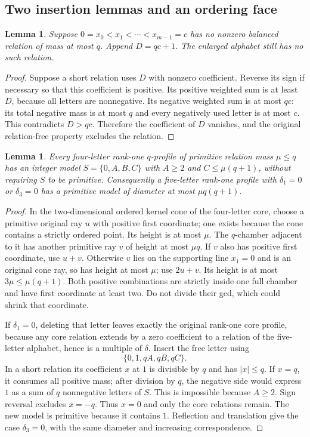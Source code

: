 \documentclass[11pt,reqno]{amsart}
\theoremstyle{plain}
\newtheorem{lemma}[theorem]{Lemma}
\theoremstyle{definition}
\theoremstyle{plain}
\theoremstyle{plain}
\theoremstyle{plain}
\theoremstyle{plain}
\theoremstyle{plain}
\theoremstyle{plain}
\theoremstyle{definition}
\theoremstyle{definition}
\theoremstyle{definition}
\theoremstyle{plain}
\begin{document}
\subsection{Two insertion lemmas and an ordering face}
\begin{lemma}\label{M-lem:append-qc-plus-one}
Suppose $0=x_0<x_1<\cdots<x_{m-1}=c$ has no nonzero balanced relation of mass
at most $q$. Append $D=qc+1$. The enlarged alphabet still has no such
relation.
\end{lemma}
\begin{proof}
Suppose a short relation uses $D$ with nonzero coefficient. Reverse its sign
if necessary so that this coefficient is positive. Its positive weighted sum
is at least $D$, because all letters are nonnegative. Its negative weighted
sum is at most $qc$: its total negative mass is at most $q$ and every
negatively used letter is at most $c$. This contradicts $D>qc$. Therefore the
coefficient of $D$ vanishes, and the original relation-free property excludes
the relation.
\end{proof}

\begin{lemma}\label{M-lem:model-near-end}
Every four-letter rank-one $q$-profile of primitive relation mass
$\mu\le q$ has an integer model $S=\{0,A,B,C\}$ with $A\ge2$ and
$C\le\mu(q+1)$, without requiring $S$ to be primitive. Consequently a
five-letter rank-one profile with $\delta_1=0$ or $\delta_3=0$ has a
primitive model of diameter at most $\mu q(q+1)$.
\end{lemma}
\begin{proof}
In the two-dimensional ordered kernel cone of the four-letter core,
choose a primitive original ray $u$ with positive first coordinate; one
exists because the cone contains a strictly ordered point. Its height
is at most $\mu$. The $q$-chamber adjacent to it has another primitive
ray $v$ of height at most $\mu q$. If $v$ also has positive first coordinate,
use $u+v$. Otherwise $v$ lies on the supporting line $x_1=0$ and is an
original cone ray, so has height at most $\mu$; use $2u+v$. Its height
is at most $3\mu\le\mu(q+1)$. Both positive combinations are strictly
inside one full chamber and have first coordinate at least two. Do not
divide their gcd, which could shrink that coordinate.

If $\delta_1=0$, deleting that letter leaves exactly the original
rank-one core profile, because any core relation extends by a zero
coefficient to a relation of the five-letter alphabet, hence is a multiple
of $\delta$. Insert the free letter using
\[
 \{0,1,qA,qB,qC\}.
\]
In a short relation its coefficient $x$ at $1$ is divisible by $q$ and has
$|x|\le q$. If $x=q$, it consumes all positive mass; after division
by $q$, the negative side would express $1$ as a sum of $q$ nonnegative
letters of $S$. This is impossible because $A\ge2$. Sign reversal
excludes $x=-q$. Thus $x=0$ and only the core relations remain. The
new model is primitive because it contains $1$. Reflection and translation
give the case $\delta_3=0$, with the same diameter and increasing
correspondence.
\end{proof}
\end{document}
